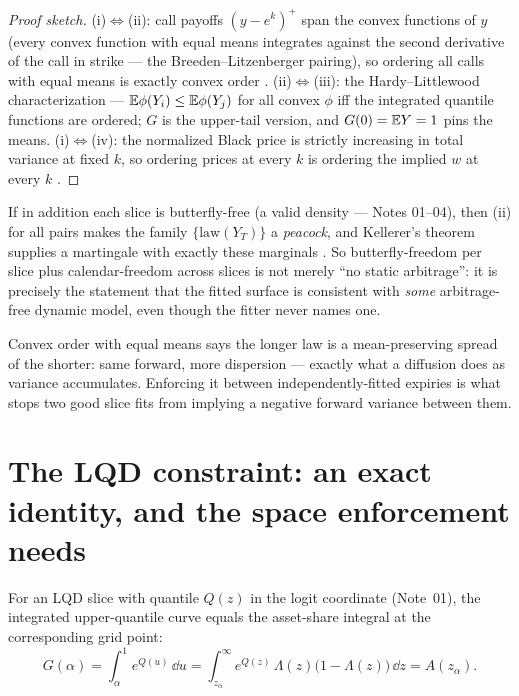 \documentclass[11pt]{article}
\begin{document}
\begin{proof}[Proof sketch]
(i)$\Leftrightarrow$(ii): call payoffs $(y-e^k)^+$ span the convex functions
of $y$ (every convex function with equal means integrates against the second
derivative of the call in strike --- the Breeden--Litzenberger pairing), so
ordering all calls with equal means is exactly convex order
\cite{Strassen1965,CarrMadan2005}.
(ii)$\Leftrightarrow$(iii): the Hardy--Littlewood characterization ---
$\mathbb{E}\phi(Y_i)\le\mathbb{E}\phi(Y_j)$ for all convex $\phi$ iff the integrated
quantile functions are ordered; $G$ is the upper-tail version, and
$G(0)=\mathbb{E} Y=1$ pins the means.
(i)$\Leftrightarrow$(iv): the normalized Black price is strictly increasing
in total variance at fixed $k$, so ordering prices at every $k$ is ordering
the implied $w$ at every $k$ \cite{GatheralJacquier2014}.
\end{proof}

\begin{remark}
\label{rem:kellerer}
If in addition each slice is butterfly-free (a valid density --- Notes
01--04), then (ii) for all pairs makes the family
$\{\mathrm{law}(Y_T)\}$ a \emph{peacock}, and Kellerer's theorem supplies a
martingale with exactly these marginals \cite{Kellerer1972}. So
butterfly-freedom per slice plus calendar-freedom across slices is not
merely ``no static arbitrage'': it is precisely the statement that the
fitted surface is consistent with \emph{some} arbitrage-free dynamic model,
even though the fitter never names one.
\end{remark}

\begin{heuristic}
Convex order with equal means says the longer law is a mean-preserving
spread of the shorter: same forward, more dispersion --- exactly what a
diffusion does as variance accumulates. Enforcing it between
independently-fitted expiries is what stops two good slice fits from
implying a negative forward variance between them.
\end{heuristic}

\section{The LQD constraint: an exact identity, and the space enforcement needs}
\label{sec:lqd}

\begin{proposition}
\label{prop:GisA}
For an LQD slice with quantile $Q(z)$ in the logit coordinate
(Note~01), the integrated upper-quantile curve equals the asset-share
integral at the corresponding grid point:
\[
G(\alpha)
=\int_\alpha^1 e^{Q(u)}\,\dd u
=\int_{z_\alpha}^{\infty}e^{Q(z)}\,\Lambda(z)\big(1-\Lambda(z)\big)\,\dd z
=A(z_\alpha).
\]
\end{proposition}
\end{document}
